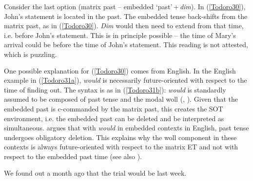 \documentclass[output=paper]{langscibook}
\begin{document}
Consider the last option (matrix past -- embedded ‘past’\,+\,\emph{dim}). In (\ref{Todoro30}), John’s statement is located in the past. The embedded tense back-shifts from the matrix past, as in (\ref{Todoro30}). \emph{Dim} would then need to extend from that time, i.e. before John’s statement. This is in principle possible -- the time of Mary’s arrival could be before the time of John’s statement. This reading is not attested, which is puzzling.\largerpage[-2]

\begin{exe}\judgewidth{\#}
\ex \label{Todoro30}
\begin{xlist}


\ex[]{\label{Todoro30b}
\tsc{[tp \textit{past} [aspp [vp [cp [tp \textit{past} [modp $\emptyset$ [aspp \textbf{\textit{dim}} [vp]]]]]]]}}

\end{xlist}
\end{exe}

One possible explanation for (\ref{Todoro30}) comes from English. In the English example in (\ref{Todoro31a}), \textit{would} is necessarily future-oriented with respect to the time of finding out. The syntax is as in (\ref{Todoro31b}): \textit{would} is standardly assumed to be composed of past tense and the modal {\sc woll} (\citealt{abusch1985a}, \citeyear{abusch1988a}). Given that the embedded past is c-commanded by the matrix past, this creates the SOT environment, i.e. the embedded past can be deleted and be interpreted as simultaneous. \citet{kusumoto1999a} argues that with \textit{would} in embedded contexts in English, past tense undergoes obligatory deletion. This explains why the {\sc woll} component in these contexts is always future-oriented with respect to the matrix ET and not with respect to the embedded past time (see also \citealt{wurmbrand2014a}). 

\begin{exe}
\ex \label{Todoro31}
\begin{xlist}

\ex \label{Todoro31a}
We found out a month ago that the trial would be last week. 

\ex \label{Todoro31b}

\end{xlist}
\end{exe}
\end{document}
